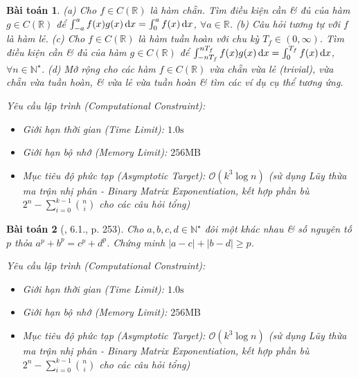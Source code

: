 \documentclass{article}
\newtheorem{baitoan}{Bài toán}
\begin{document}
\begin{baitoan}
	(a) Cho $f\in C(\mathbb{R})$ là hàm chẵn. Tìm điều kiện cần \& đủ của hàm $g\in C(\mathbb{R})$ để $\int_{-a}^a f(x)g(x)\,{\rm d}x = \int_0^a f(x)\,{\rm d}x$, $\forall a\in\mathbb{R}$. (b) Câu hỏi tương tự với $f$ là hàm lẻ. (c) Cho $f\in C(\mathbb{R})$ là hàm tuần hoàn với chu kỳ $T_f\in(0,\infty)$. Tìm điều kiện cần \& đủ của hàm $g\in C(\mathbb{R})$ để  $\int_{-nT_f}^{nT_f} f(x)g(x)\,{\rm d}x = \int_0^{T_f} f(x)\,{\rm d}x$, $\forall n\in\mathbb{N}^\star$. (d) Mở rộng cho các hàm $f\in C(\mathbb{R})$ vừa chẵn vừa lẻ (trivial), vừa chẵn vừa tuần hoàn, \& vừa lẻ vừa tuần hoàn \& tìm các ví dụ cụ thể tương ứng.

    \vspace{0.5em}
    \emph{Yêu cầu lập trình (Computational Constraint):}
    \begin{itemize}
        \item Giới hạn thời gian (Time Limit): $1.0\mathrm{s}$
        \item Giới hạn bộ nhớ (Memory Limit): $256\mathrm{MB}$
        \item Mục tiêu độ phức tạp (Asymptotic Target): $\mathcal{O}(k^3 \log n)$ (sử dụng Lũy thừa ma trận nhị phân - Binary Matrix Exponentiation, kết hợp phần bù $2^n - \sum_{i=0}^{k-1} \binom{n}{i}$ cho các câu hỏi tổng)
    \end{itemize}
\end{baitoan}


\begin{baitoan}[\cite{Quoc_Long_Dat_Nam_VMC}, 6.1., p. 253]
	Cho $a,b,c,d\in\mathbb{N}^\star$ đôi một khác nhau \& số nguyên tố $p$ thỏa $a^p + b^p = c^p + d^p$. Chứng minh $|a - c| + |b - d|\ge p$.

    \vspace{0.5em}
    \emph{Yêu cầu lập trình (Computational Constraint):}
    \begin{itemize}
        \item Giới hạn thời gian (Time Limit): $1.0\mathrm{s}$
        \item Giới hạn bộ nhớ (Memory Limit): $256\mathrm{MB}$
        \item Mục tiêu độ phức tạp (Asymptotic Target): $\mathcal{O}(k^3 \log n)$ (sử dụng Lũy thừa ma trận nhị phân - Binary Matrix Exponentiation, kết hợp phần bù $2^n - \sum_{i=0}^{k-1} \binom{n}{i}$ cho các câu hỏi tổng)
    \end{itemize}
\end{baitoan}
\end{document}

